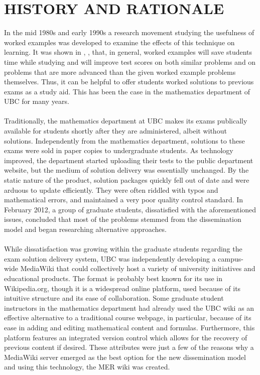 \documentclass{primus}
\begin{document}
\section{HISTORY AND RATIONALE}\label{sec:History_and_Rationale}
In the mid 1980s and early 1990s a research movement studying the usefulness of worked examples was developed to examine the effects of this technique on learning. It was shown in \cite{CS1}, \cite{CS2}, \cite{PM} that, in general, worked examples will save students time while studying and will improve test scores on both similar problems and on problems that are more advanced than the given worked example problems themselves. Thus, it can be helpful to offer students worked solutions to previous exams as a study aid. This has been the case in the mathematics department of UBC for many years.
\\\\
\noindent{}Traditionally, the mathematics department at UBC makes its exams publically available for students shortly after they are administered, albeit without solutions. Independently from the mathematics department, solutions to these exams were sold in paper copies to undergraduate students. As technology improved, the department started uploading their tests to the public department website, but the medium of solution delivery was essentially unchanged. By the static nature of the product, solution packages quickly fell out of date and were arduous to update efficiently. They were often riddled with typos and mathematical errors, and maintained a very poor quality control standard. In February 2012, a group of graduate students, dissatisfied with the aforementioned issues, concluded that most of the problems stemmed from the dissemination model and began researching alternative approaches.
\\\\
\noindent{}While dissatisfaction was growing within the graduate students regarding the exam solution delivery system, UBC was independently developing a campus-wide MediaWiki that could collectively host a variety of university initiatives and educational products. The format is probably best known for its use in Wikipedia.org, though it is a widespread online platform, used because of its intuitive structure and its ease of collaboration. Some graduate student instructors in the mathematics department had already used the UBC wiki as an effective alternative to a traditional course webpage, in particular, because of its ease in adding and editing mathematical content and formulas. Furthermore, this platform features an integrated version control which allows for the recovery of previous content if desired. These attributes were just a few of the reasons why a MediaWiki server emerged as the best option for the new dissemination model and using this technology, the MER wiki was created.
\end{document}
